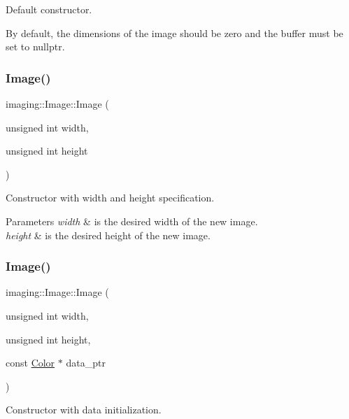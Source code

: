 Default constructor.

By default, the dimensions of the image should be zero and the buffer must be set to nullptr. \mbox{\label{classimaging_1_1_image_aefa58d670974137c9409fa26b6c2c12e}} 
\subsubsection{\texorpdfstring{Image()}{Image()}\hspace{0.1cm}{\footnotesize\ttfamily [2/4]}}
{\footnotesize\ttfamily imaging\+::\+Image\+::\+Image (\begin{DoxyParamCaption}\item[{unsigned int}]{width,  }\item[{unsigned int}]{height }\end{DoxyParamCaption})}

Constructor with width and height specification.


\begin{DoxyParams}{Parameters}
{\em width} & is the desired width of the new image. \\
\hline
{\em height} & is the desired height of the new image. \\
\hline
\end{DoxyParams}
\mbox{\label{classimaging_1_1_image_a029a91e59afb23b851cbdc43da68d0dd}} 
\subsubsection{\texorpdfstring{Image()}{Image()}\hspace{0.1cm}{\footnotesize\ttfamily [3/4]}}
{\footnotesize\ttfamily imaging\+::\+Image\+::\+Image (\begin{DoxyParamCaption}\item[{unsigned int}]{width,  }\item[{unsigned int}]{height,  }\item[{const \hyperlink{classmath_1_1_vec3}{Color} $\ast$}]{data\+\_\+ptr }\end{DoxyParamCaption})}

Constructor with data initialization.


